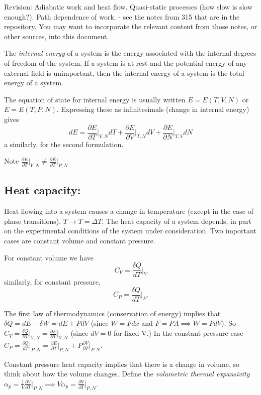 \documentclass{article}
\begin{document}
Revision: Adiabatic work and heat flow. Quasi-static processes (how slow is slow enough?). Path dependence of work.
 - see the notes from 315 that are in the repository. You may want to incorporate the relevant content from those notes, or other sources, into this document.


The \emph{internal energy} of a system is the energy associated with the internal degrees of freedom of the system. If a system is at rest and the potential energy of any external field is unimportant, then the internal energy of a system is the total energy of a system.

The equation of state for internal energy is usually written $E = E(T,V,N)$ or $E = E(T,P,N)$. Expressing these as infinitesimals (change in internal energy) gives
$$ dE = \frac{\partial E}{\partial T}\bigg\vert_{V,N}dT + \frac{\partial E}{\partial V}\bigg\vert_{T,N}dV +\frac{\partial E}{\partial N}\bigg\vert_{T,V}dN$$
a similarly, for the second formulation.

Note $ \frac{\partial E}{\partial T}\vert_{V,N} \neq \frac{\partial E}{\partial T}\vert_{P,N} $

\subsection*{Heat capacity:}
Heat flowing into a system causes a change in temperature (except in the case of phase transitions). $T\rightarrow T=\Delta T$. The heat capacity of a system depends, in part on the experimental conditions of the system under consideration. Two important cases are constant volume and constant pressure.

For constant volume we have
$$C_V = \frac{\delta Q}{dT}\bigg\vert_V$$
similarly, for constant pressure,
$$C_P = \frac{\delta Q}{dT}\bigg\vert_P.$$

The first law of thermodynamics (conservation of energy) implies that $\delta Q = dE - \delta W = dE + PdV$  (since $W = Fdx$ and $F=PA \implies W = PdV$). So
$C_V = \frac{\delta Q}{\partial T}\vert_{V,N} = \frac{\partial E}{\partial T}\vert_{V,N}$ (since $dV=0$ for fixed V.)
In the constant pressure case $C_P = \frac{\delta Q}{dT}\vert_{P,N} = \frac{\partial E}{\partial T}\vert_{P,N} + P\frac{\partial V}{\partial T}\vert_{P,N}$.

Constant pressure heat capacity implies that there is a change in volume, so think about how the volume changes. Define the \emph{volumetric thermal expansivity} $\alpha_p = \frac{1}{V}\frac{\partial V}{\partial T}\vert_{P,N} \implies V\alpha_p =\frac{\partial V}{\partial T}\vert_{P,N}$.
\end{document}
